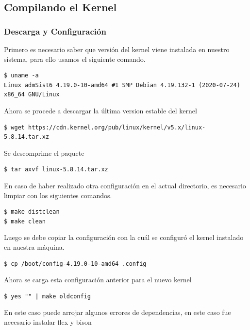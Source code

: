 \documentclass[12pt]{article}
\begin{document}
\subsection{Compilando el Kernel}

\subsubsection{Descarga y Configuración}

Primero es necesario saber que versión del kernel viene instalada en nuestro sistema, para ello usamos el siguiente comando.

\begin{lstlisting}[frame=single]
$ uname -a
Linux admSist6 4.19.0-10-amd64 #1 SMP Debian 4.19.132-1 (2020-07-24) x86_64 GNU/Linux
\end{lstlisting}

Ahora se procede a descargar la última version estable del kernel

\begin{lstlisting}[frame=single]
$ wget https://cdn.kernel.org/pub/linux/kernel/v5.x/linux-5.8.14.tar.xz
\end{lstlisting}

Se descomprime el paquete

\begin{lstlisting}[frame=single]
$ tar axvf linux-5.8.14.tar.xz
\end{lstlisting}

En caso de haber realizado otra configuración en el actual directorio, es necesario limpiar con los siguientes comandos.

\begin{lstlisting}[frame=single]
$ make distclean
$ make clean
\end{lstlisting}

Luego se debe copiar la configuración con la cuál se configuró el kernel instalado en nuestra máquina.
\begin{lstlisting}[frame=single]
$ cp /boot/config-4.19.0-10-amd64 .config
\end{lstlisting}

Ahora se carga esta configuración anterior para el nuevo kernel
\begin{lstlisting}[frame=single]
$ yes "" | make oldconfig
\end{lstlisting}

En este caso puede arrojar algunos errores de dependencias, en este caso fue necesario instalar flex y bison
\end{document}
